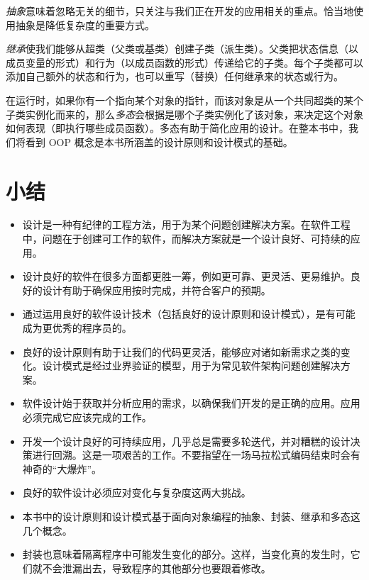\emph{抽象}意味着忽略无关的细节，只关注与我们正在开发的应用相关的重点。恰当地使用抽象是降低复杂度的重要方式。

\emph{继承}使我们能够从超类（父类或基类）创建子类（派生类）。父类把状态信息（以成员变量的形式）和行为（以成员函数的形式）传递给它的子类。每个子类都可以添加自己额外的状态和行为，也可以重写（替换）任何继承来的状态或行为。

在运行时，如果你有一个指向某个对象的指针，而该对象是从一个共同超类的某个子类实例化而来的，那么\emph{多态}会根据是哪个子类实例化了该对象，来决定这个对象如何表现（即执行哪些成员函数）。多态有助于简化应用的设计。在整本书中，我们将看到 OOP 概念是本书所涵盖的设计原则和设计模式的基础。

\section*{小结}

\begin{itemize}
\item 设计是一种有纪律的工程方法，用于为某个问题创建解决方案。在软件工程中，问题在于创建可工作的软件，而解决方案就是一个设计良好、可持续的应用。
\item 设计良好的软件在很多方面都更胜一筹，例如更可靠、更灵活、更易维护。良好的设计有助于确保应用按时完成，并符合客户的预期。
\item 通过运用良好的软件设计技术（包括良好的设计原则和设计模式），是有可能成为更优秀的程序员的。
\item 良好的设计原则有助于让我们的代码更灵活，能够应对诸如新需求之类的变化。设计模式是经过业界验证的模型，用于为常见软件架构问题创建解决方案。
\item 软件设计始于获取并分析应用的需求，以确保我们开发的是正确的应用。应用必须完成它应该完成的工作。
\item 开发一个设计良好的可持续应用，几乎总是需要多轮迭代，并对糟糕的设计决策进行回溯。这是一项艰苦的工作。不要指望在一场马拉松式编码结束时会有神奇的“大爆炸”。
\item 良好的软件设计必须应对变化与复杂度这两大挑战。
\item 本书中的设计原则和设计模式基于面向对象编程的抽象、封装、继承和多态这几个概念。
\item 封装也意味着隔离程序中可能发生变化的部分。这样，当变化真的发生时，它们就不会泄漏出去，导致程序的其他部分也要跟着修改。
\end{itemize}
